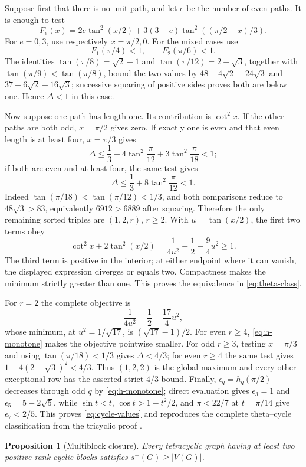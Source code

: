 \documentclass[11pt]{article}
\newtheorem{proposition}[theorem]{Proposition}
\theoremstyle{remark}
\newcommand{\splus}{s^+}
\begin{document}
Suppose first that there is no unit path, and let $e$ be the number of even
paths.  It is enough to test
\[
 F_e(x)=2e\tan^2(x/2)+3(3-e)
              \tan^2((\pi/2-x)/3).
\]
For $e=0,3$, use respectively $x=\pi/2,0$.  For the mixed cases use
\[
 F_1(\pi/4)<1,
 \qquad F_2(\pi/6)<1.
\]
The identities $\tan(\pi/8)=\sqrt2-1$ and
$\tan(\pi/12)=2-\sqrt3$, together with
$\tan(\pi/9)<\tan(\pi/8)$, bound the two values by
$48-4\sqrt2-24\sqrt3$ and $37-6\sqrt2-16\sqrt3$; successive squaring of
positive sides proves both are below one.  Hence $\Delta<1$ in this case.

Now suppose one path has length one.  Its contribution is $\cot^2x$.  If the
other paths are both odd, $x=\pi/2$ gives zero.  If exactly one is even and
that even length is at least four, $x=\pi/3$ gives
\[
 \Delta\leq\frac13+4\tan^2\frac\pi{12}
                    +3\tan^2\frac\pi{18}<1;
\]
if both are even and at least four, the same test gives
\[
 \Delta\leq\frac13+8\tan^2\frac\pi{12}<1.
\]
Indeed $\tan(\pi/18)<\tan(\pi/12)<1/3$, and both comparisons reduce to
$48\sqrt3>83$, equivalently $6912>6889$ after squaring.  Therefore the only
remaining sorted triples are $(1,2,r)$, $r\geq2$.  With
$u=\tan(x/2)$, the first two terms obey
\[
 \cot^2x+2\tan^2(x/2)
 =\frac1{4u^2}-\frac12+\frac94u^2\geq1.
\]
The third term is positive in the interior; at either endpoint where it can
vanish, the displayed expression diverges or equals two.  Compactness makes
the minimum strictly greater than one.  This proves the equivalence in
\eqref{eq:theta-class}.

For $r=2$ the complete objective is
\[
 \frac1{4u^2}-\frac12+\frac{17}{4}u^2,
\]
whose minimum, at $u^2=1/\sqrt{17}$, is
$(\sqrt{17}-1)/2$.  For even $r\geq4$, \eqref{eq:h-monotone} makes the
objective pointwise smaller.  For odd $r\geq3$, testing $x=\pi/3$ and using
$\tan(\pi/18)<1/3$ gives $\Delta<4/3$; for even $r\geq4$ the same test gives
$1+4(2-\sqrt3)^2<4/3$.  Thus $(1,2,2)$ is the global maximum and every other
exceptional row has the asserted strict $4/3$ bound.  Finally,
$\epsilon_q=h_q(\pi/2)$ decreases through odd $q$ by
\eqref{eq:h-monotone}; direct evaluation gives $\epsilon_3=1$ and
$\epsilon_5=5-2\sqrt5$, while
$\sin t<t$, $\cos t>1-t^2/2$, and $\pi<22/7$ at $t=\pi/14$ give
$\epsilon_7<2/5$.  This proves \eqref{eq:cycle-values} and reproduces the
complete theta--cycle classification from the tricyclic proof
\cite{TricyclicGraphs}.

\begin{proposition}[Multiblock closure]\label{prop:multiblock}
Every tetracyclic graph having at least two positive-rank cyclic blocks
satisfies $\splus(G)\geq|V(G)|$.
\end{proposition}
\end{document}
